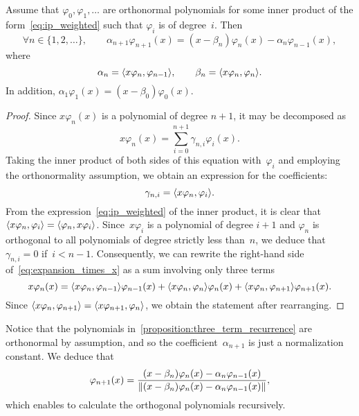 \begin{proposition}
    \label{proposition:three_term_recurrence}
    Assume that $\varphi_0, \varphi_1, \dotsc$ are orthonormal polynomials
    for some inner product of the form~\eqref{eq:ip_weighted} such that $\varphi_i$ is of degree~$i$.
    Then
    \begin{equation}
        \label{eq:recurrence_ortho}
        \forall n \in \{1, 2, \dotsc\}, \qquad
        \alpha_{n+1} \varphi_{n+1} (x) = (x - \beta_n) \varphi_n(x) - \alpha_{n} \varphi_{n-1}(x),
    \end{equation}
    where
    \[
        \alpha_n = \ip[big]{x \varphi_n, \varphi_{n-1}},
        \qquad \beta_n = \ip[big]{x \varphi_n, \varphi_{n}}.
    \]
    In addition, $\alpha_1 \varphi_{1} (x) = (x - \beta_0) \varphi_0(x)$.
\end{proposition}
\begin{proof}
    Since $x \varphi_n(x)$ is a polynomial of degree $n+1$,
    it may be decomposed as
    \begin{equation}
        \label{eq:expansion_times_x}
        x \varphi_n(x) = \sum_{i=0}^{n+1} \gamma_{n,i} \varphi_i(x).
    \end{equation}
    Taking the inner product of both sides of this equation with~$\varphi_i$
    and employing the orthonormality assumption,
    we obtain an expression for the coefficients:
    \[
        \gamma_{n,i} = \ip[big]{x \varphi_n, \varphi_i}.
    \]
    From the expression~\eqref{eq:ip_weighted} of the inner product,
    it is clear that $\ip[big]{x \varphi_n, \varphi_i} = \ip[big]{\varphi_n, x\varphi_i}$.
    Since~$x \varphi_i$ is a polynomial of degree $i+1$ and $\varphi_n$ is orthogonal to all polynomials of degree strictly less than~$n$,
    we deduce that $\gamma_{n,i} = 0$ if~$i < n-1$.
    Consequently, we can rewrite the right-hand side of~\eqref{eq:expansion_times_x} as a sum involving only three terms
    \begin{equation}
        \label{eq:expansion_times_x_good}
        x \varphi_n(x) =  \ip[big]{x \varphi_n, \varphi_{n-1}} \varphi_{n-1}(x) + \ip[big]{x \varphi_n, \varphi_{n}} \varphi_{n}(x) + \ip[big]{x \varphi_n, \varphi_{n+1}} \varphi_{n+1}(x).
    \end{equation}
    Since $\ip[big]{x \varphi_n, \varphi_{n+1}} = \ip[big]{x \varphi_{n+1}, \varphi_{n}}$,
    we obtain the statement after rearranging.
\end{proof}
\begin{remark}
    Notice that the polynomials in~\cref{proposition:three_term_recurrence} are orthonormal by assumption,
    and so the coefficient~$\alpha_{n+1}$ is just a normalization constant.
    We deduce that
    \[
        \varphi_{n+1} (x) = \frac{(x - \beta_n) \varphi_n(x) - \alpha_{n} \varphi_{n-1}(x)}{\lVert(x - \beta_n) \varphi_n(x) - \alpha_{n} \varphi_{n-1}(x)\rVert},
    \]
    which enables to calculate the orthogonal polynomials recursively.
\end{remark}

